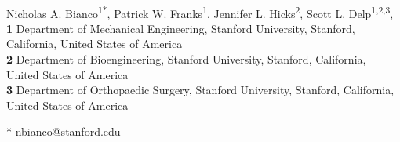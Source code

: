 \documentclass[10pt,letterpaper]{article}
\begin{document}
\vspace*{0.2in}

\begin{flushleft}
{\Large
\textbf{} %
}
\newline
\\
Nicholas A. Bianco\textsuperscript{1*},
Patrick W. Franks\textsuperscript{1},
Jennifer L. Hicks\textsuperscript{2},
Scott L. Delp\textsuperscript{1,2,3},
\\
\bigskip
\textbf{1} Department of Mechanical Engineering, Stanford University, Stanford, California, United States of America
\\
\textbf{2} Department of Bioengineering, Stanford University, Stanford, California, United States of America
\\
\textbf{3} Department of Orthopaedic Surgery, Stanford University, Stanford, California, United States of America
\\
\bigskip


* nbianco@stanford.edu

\end{flushleft}
\end{document}
